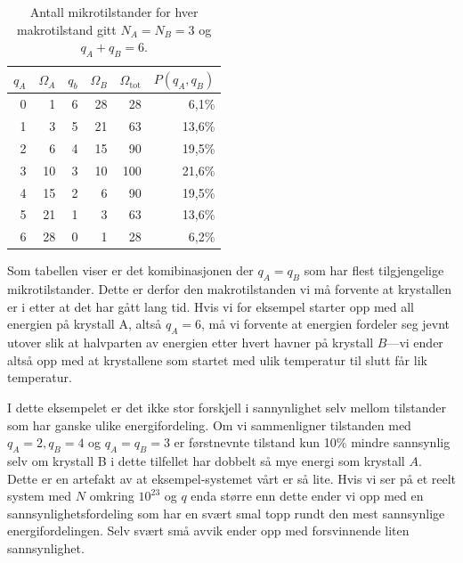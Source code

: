 \begin{table}[htp]
\begin{center}
\begin{tabular}{rr|rr|r|r}
$q_A$ & $\Omega_A$ & $q_b$ & $\Omega_B$ & $\Omega_\text{tot}$ & $P(q_A,q_B)$ \\ 
\hline
0 & 1 & 6 & 28 & 28 & 6,1\% \\
1 & 3 & 5 & 21 & 63 & 13,6\% \\
2 & 6 & 4 & 15 & 90 & 19,5\%\\
3 & 10 & 3 & 10 & 100 & 21,6\% \\
4 & 15 & 2 & 6 & 90 & 19,5\% \\
5 & 21 & 1 & 3 & 63 & 13,6\% \\
6 & 28 & 0 & 1 & 28 & 6,2\% \\
\end{tabular}
\end{center}
\caption{Antall mikrotilstander for hver makrotilstand gitt $N_A = N_B = 3$ og $q_A + q_B=6$. }
\label{tab:t2:multipl2}
\end{table}

Som tabellen viser er det komibinasjonen der $q_A = q_B$ som har flest tilgjengelige mikrotilstander. Dette er derfor den makrotilstanden vi må forvente at krystallen er i etter at det har gått lang tid. Hvis vi for eksempel starter opp med all energien på krystall A, altså $q_A = 6$, må vi forvente at energien fordeler seg jevnt utover slik at halvparten av energien etter hvert havner på krystall $B$---vi ender altså opp med at krystallene som startet med ulik temperatur til slutt får lik temperatur.

I dette eksempelet er det ikke stor forskjell i sannynlighet selv mellom tilstander som har ganske ulike energifordeling. Om vi sammenligner tilstanden med $q_A=2, q_B=4$ og $q_A = q_B = 3$ er førstnevnte tilstand kun 10\% mindre sannsynlig selv om krystall B i dette tilfellet har dobbelt så mye energi som krystall $A$. Dette er en artefakt av at eksempel-systemet vårt er så lite. Hvis vi ser på et reelt system med $N$ omkring $10^{23}$ og $q$ enda større enn dette ender vi opp med en sannsynlighetsfordeling som har en svært smal topp rundt den mest sannsynlige energifordelingen. Selv svært små avvik ender opp med forsvinnende liten sannsynlighet.

